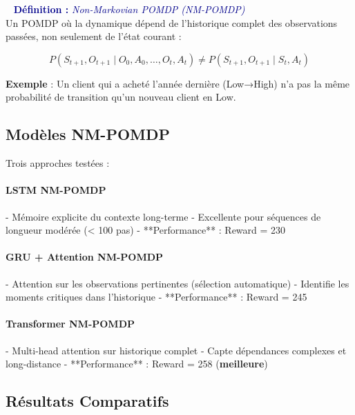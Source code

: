 \documentclass[11pt,a4paper]{article}
\newenvironment{defbox}[1]{%
  \vspace{3pt}\begin{framed}
  \noindent{\color{NavyBlue}\rule{0.3cm}{3pt}}~%
  \textcolor{DarkBlue}{\textbf{Définition :} \textit{#1}}\\[3pt]}
  {\end{framed}\vspace{3pt}}
\begin{document}
\begin{defbox}{Non-Markovian POMDP (NM-POMDP)}
Un POMDP où la dynamique dépend de l'historique complet des observations passées, non seulement de l'état courant :
 
$$P(S_{t+1}, O_{t+1} \mid O_0, A_0, \ldots, O_t, A_t) \neq P(S_{t+1}, O_{t+1} \mid S_t, A_t)$$
\end{defbox}
 
\textbf{Exemple} : Un client qui a acheté l'année dernière (Low→High) n'a pas la même probabilité de transition qu'un nouveau client en Low.
 
\subsection{Modèles NM-POMDP}
 
Trois approches testées :
 
\paragraph{LSTM NM-POMDP}
- Mémoire explicite du contexte long-terme
- Excellente pour séquences de longueur modérée (< 100 pas)
- **Performance** : Reward = 230
 
\paragraph{GRU + Attention NM-POMDP}
- Attention sur les observations pertinentes (sélection automatique)
- Identifie les moments critiques dans l'historique
- **Performance** : Reward = 245
 
\paragraph{Transformer NM-POMDP}
- Multi-head attention sur historique complet
- Capte dépendances complexes et long-distance
- **Performance** : Reward = 258 (\textbf{meilleure})
 
\subsection{Résultats Comparatifs}
 
\end{document}
